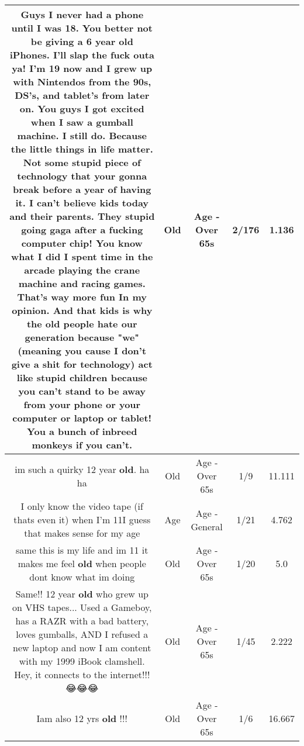 \documentclass[11pt]{article}
\newlength\mylength
\begin{document}
\begin{center}
\begin{longtable}{|C{.65\mylength}|C{.30\mylength}|C{.12\mylength}|C{.12\mylength}|C{.12\mylength}|}
  \small Guys I never had a phone until I was 18. You better not be giving a 6 year \textbf{old} iPhones. I'll slap the fuck outa ya! I'm 19 now and I grew up with Nintendos from the 90s, DS's, and tablet's from later on. You guys I got excited when I saw a gumball machine. I still do. Because the little things in life matter. Not some stupid piece of technology that your gonna break before a year of having it. I can't believe kids today and their parents. They stupid going gaga after a fucking computer chip! You know what I did I spent time in the arcade playing the crane machine and racing games. That's way more fun In my opinion. And that kids is why the \textbf{old} people hate our generation because "we" (meaning you cause I don't give a shit for technology) act like stupid children because you can't stand to be away from your phone or your computer or laptop or tablet! You a bunch of inbreed monkeys if you can't.\normalsize   & Old & Age - Over 65s & 2/176 & 1.136 \\  \hline
  \small im such a quirky 12 year \textbf{old}. ha ha\normalsize   & Old & Age - Over 65s & 1/9 & 11.111 \\  \hline
  \small I only know the video tape (if thats even it) when I'm 11I guess that makes sense for my age\normalsize   & Age & Age - General & 1/21 & 4.762 \\  \hline
  \small same this is my life and im 11 it makes me feel \textbf{old} when people dont know what im doing\normalsize   & Old & Age - Over 65s & 1/20 & 5.0 \\  \hline
  \small Same!! 12 year \textbf{old} who grew up on VHS tapes... Used a Gameboy, has a RAZR with a bad battery, loves gumballs, AND I refused a new laptop and now I am content with my 1999 iBook clamshell. Hey, it connects to the internet!!! 😂😂😂\normalsize   & Old & Age - Over 65s & 1/45 & 2.222 \\  \hline
  \small Iam also 12 yrs \textbf{old} !!!\normalsize   & Old & Age - Over 65s & 1/6 & 16.667 \\  \hline

\end{longtable}
\end{center}
\end{document}
